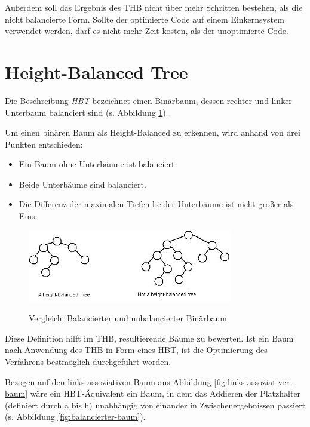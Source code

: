 Außerdem soll das Ergebnis des \ac{THB} nicht über mehr Schritten bestehen, als die nicht balancierte Form. Sollte der optimierte Code auf einem Einkernsystem verwendet werden, darf es nicht mehr Zeit kosten, als der unoptimierte Code.


\section{Height-Balanced Tree}
Die Beschreibung \textit{\ac{HBT}} bezeichnet einen Binärbaum, dessen rechter und linker Unterbaum balanciert sind (s. Abbildung \ref{fig:vgl-hbt}) \cite{hbt}.


Um einen binären Baum als Height-Balanced zu erkennen, wird anhand von drei Punkten entschieden:

\begin{itemize} 
	\item Ein Baum ohne Unterbäume ist balanciert.
	\item Beide Unterbäume sind balanciert. 
	\item Die Differenz der maximalen Tiefen beider Unterbäume ist nicht großer als Eins. 
\end{itemize}

\begin{figure}
	\begin{center}
		\includegraphics[width=0.8\textwidth]{images/balanced_tree}\\
	\end{center}
	\caption[Vergleich: Balancierter und unbalancierter Binärbaum]{Vergleich: Balancierter und unbalancierter Binärbaum \cite{geeks}}
	\label{fig:vgl-hbt}
\end{figure}


Diese Definition hilft im \ac{THB}, resultierende Bäume zu bewerten. Ist ein Baum nach Anwendung des \ac{THB} in Form eines \ac{HBT}, ist die Optimierung des Verfahrens bestmöglich durchgeführt worden.

Bezogen auf den links-assoziativen Baum aus Abbildung \ref{fig:links-assoziativer-baum} wäre ein \ac{HBT}-Äquivalent ein Baum, in dem das Addieren der Platzhalter (definiert durch a bis h) unabhängig von einander in Zwischenergebnissen passiert (s. Abbildung \ref{fig:balancierter-baum}).

